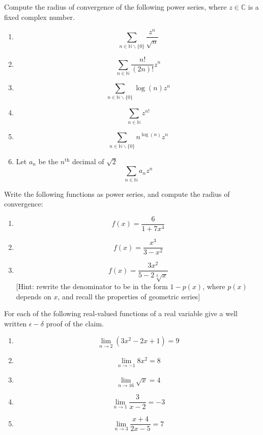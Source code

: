 \documentclass[11pt]{article}%
\begin{document}
\begin{Exercise}[title=***]
Compute the radius of convergence of the following power series, where $z\in\mathbb{C}$ is a fixed complex number.
\begin{enumerate}
	\item $$\displaystyle\sum_{n\in\mathbb{N}\backslash\{0\}} \frac{z^n}{\sqrt{n}}$$
	\item $$\displaystyle\sum_{n\in\mathbb{N}}\frac{n!}{(2n)!}z^n$$
	\item $$\displaystyle\sum_{n\in\mathbb{N}\backslash\{0\}}\log(n)z^n$$
	\item $$\displaystyle\sum_{n\in\mathbb{N}}z^{n!}$$
	\item $$\displaystyle\sum_{n\in\mathbb{N}\backslash\{0\}}n^{\log(n)}z^n$$
	\item Let $a_n$ be the $n^{\text{th}}$ decimal of $\sqrt{2}$ $$\displaystyle\sum_{n\in\mathbb{N}}a_nz^n$$
\end{enumerate}
\end{Exercise}

\begin{Exercise}[title=***]
Write the following functions as power series, and compute the radius of convergence:
\begin{enumerate}
	\item $$f(x) = \frac{6}{1+7x^4}$$
	\item $$f(x) = \frac{x^3}{3-x^2}$$
	\item $$f(x) = \frac{3x^2}{5-2\sqrt[3]{x}}$$
	[Hint: rewrite the denominator to be in the form $1-p(x)$, where $p(x)$ depends on $x$, and recall the properties of geometric series]
\end{enumerate}
\end{Exercise}

\newpage

\begin{Exercise}[title=**$\dagger$]
For each of the following real-valued functions of a real variable give a well
written $\epsilon-\delta$ proof of the claim.
\begin{enumerate}
	\item $$\lim_{n\rightarrow2}(3x^2-2x + 1)=9$$
	\item $$\lim_{n\rightarrow-1}8x^2=8$$
	\item $$\lim_{n\rightarrow16}\sqrt{x}=4$$
	\item $$\lim_{n\rightarrow1}\frac{3}{x-2}=-3$$
	\item $$\lim_{n\rightarrow3}\frac{x+4}{2x-5}=7$$
\end{enumerate}
\end{Exercise}
\end{document}
